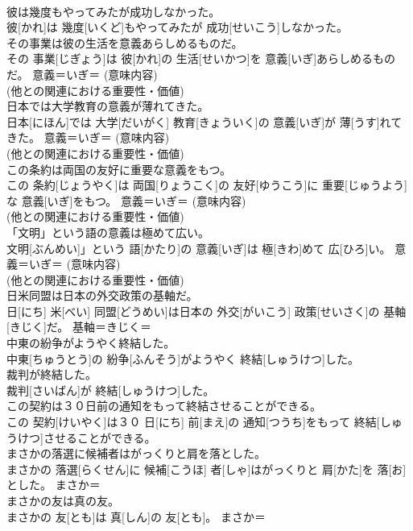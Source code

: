 \documentclass[8pt]{extreport}
\begin{document}
\begin{CJK}{UTF8}{min}
{\\	彼は幾度もやってみたが成功しなかった。	
\\	彼[かれ]は 幾度[いくど]もやってみたが 成功[せいこう]しなかった。	
\\	その事業は彼の生活を意義あらしめるものだ。	
\\	その 事業[じぎょう]は 彼[かれ]の 生活[せいかつ]を 意義[いぎ]あらしめるものだ。	意義＝いぎ＝ (意味内容) 
\\	(他との関連における重要性・価値) 
\\	日本では大学教育の意義が薄れてきた。	
\\	日本[にほん]では 大学[だいがく] 教育[きょういく]の 意義[いぎ]が 薄[うす]れてきた。	意義＝いぎ＝ (意味内容) 
\\	(他との関連における重要性・価値) 
\\	この条約は両国の友好に重要な意義をもつ。	
\\	この 条約[じょうやく]は 両国[りょうこく]の 友好[ゆうこう]に 重要[じゅうよう]な 意義[いぎ]をもつ。	意義＝いぎ＝ (意味内容) 
\\	(他との関連における重要性・価値) 
\\	「文明」という語の意義は極めて広い。	
\\	文明[ぶんめい]」という 語[かたり]の 意義[いぎ]は 極[きわ]めて 広[ひろ]い。	意義＝いぎ＝ (意味内容) 
\\	(他との関連における重要性・価値) 
\\	日米同盟は日本の外交政策の基軸だ。	
\\	日[にち] 米[べい] 同盟[どうめい]は日本の 外交[がいこう] 政策[せいさく]の 基軸[きじく]だ。	基軸＝きじく＝ 
\\	中東の紛争がようやく終結した。	
\\	中東[ちゅうとう]の 紛争[ふんそう]がようやく 終結[しゅうけつ]した。	
\\	裁判が終結した。	
\\	裁判[さいばん]が 終結[しゅうけつ]した。	
\\	この契約は３０日前の通知をもって終結させることができる。	
\\	この 契約[けいやく]は３０ 日[にち] 前[まえ]の 通知[つうち]をもって 終結[しゅうけつ]させることができる。	
\\	まさかの落選に候補者はがっくりと肩を落とした。	
\\	まさかの 落選[らくせん]に 候補[こうほ] 者[しゃ]はがっくりと 肩[かた]を 落[お]とした。	まさか＝ 
\\	まさかの友は真の友。	
\\	まさかの 友[とも]は 真[しん]の 友[とも]。	まさか＝ 
}
\end{CJK}
\end{document}
